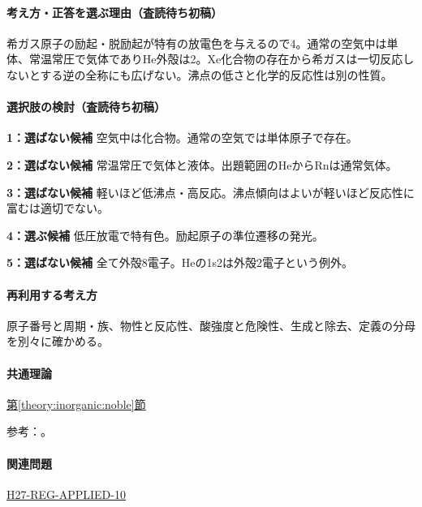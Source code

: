 \paragraph{考え方・正答を選ぶ理由（査読待ち初稿）} 希ガス原子の励起・脱励起が特有の放電色を与えるので4。通常の空気中は単体、常温常圧で気体でありHe外殻は2。Xe化合物の存在から希ガスは一切反応しないとする逆の全称にも広げない。沸点の低さと化学的反応性は別の性質。

\paragraph{選択肢の検討（査読待ち初稿）}\mbox{}\par

\noindent\textbf{1：選ばない候補} 空気中は化合物。通常の空気では単体原子で存在。\par

\noindent\textbf{2：選ばない候補} 常温常圧で気体と液体。出題範囲のHeからRnは通常気体。\par

\noindent\textbf{3：選ばない候補} 軽いほど低沸点・高反応。沸点傾向はよいが軽いほど反応性に富むは適切でない。\par

\noindent\textbf{4：選ぶ候補} 低圧放電で特有色。励起原子の準位遷移の発光。\par

\noindent\textbf{5：選ばない候補} 全て外殻8電子。Heの1s2は外殻2電子という例外。\par

\paragraph{再利用する考え方} 原子番号と周期・族、物性と反応性、酸強度と危険性、生成と除去、定義の分母を別々に確かめる。

\paragraph{共通理論} \hyperref[theory:inorganic:noble]{第\ref*{theory:inorganic:noble}節}

\par 参考：\cite{inorganic_noble_ref}。

\paragraph{関連問題} \hyperref[q:h27-reg-applied-10]{H27-REG-APPLIED-10}

